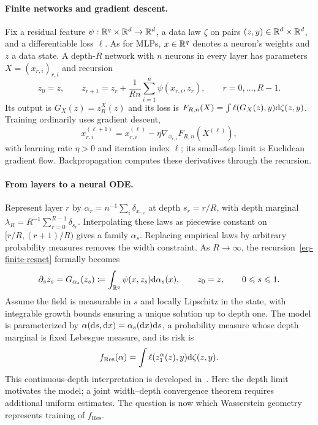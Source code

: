 \paragraph{Finite networks and gradient descent.}
Fix a residual feature $\psi:\mathbb{R}^q\times\mathbb{R}^d\to\mathbb{R}^d$, a data law $\zeta$ on pairs $(z,y)\in\mathbb{R}^d\times\mathbb{R}^d$, and a differentiable loss $\ell$. As for MLPs, $x\in\mathbb{R}^q$ denotes a neuron's weights and $z$ a data state. A depth-$R$ network with $n$ neurons in every layer has parameters $X=(x_{r,i})_{r,i}$ and recursion
\begin{equation}\label{eq-finite-resnet}
  z_0=z,\qquad
  z_{r+1}=z_r+\frac1{Rn}\sum_{i=1}^n\psi(x_{r,i},z_r),
  \qquad r=0,\ldots,R-1.
\end{equation}
Its output is $G_X(z)=z_R^X(z)$ and its loss is $F_{R,n}(X)=\int\ell(G_X(z),y)\mathrm{d}\zeta(z,y)$. Training ordinarily uses gradient descent,
\[
  x_{r,i}^{(\ell+1)}=x_{r,i}^{(\ell)}
  -\eta\nabla_{x_{r,i}}F_{R,n}(X^{(\ell)}),
\]
with learning rate $\eta>0$ and iteration index $\ell$; its small-step limit is Euclidean gradient flow. Backpropagation computes these derivatives through the recursion.

\paragraph{From layers to a neural ODE.}
Represent layer $r$ by $\alpha_r=n^{-1}\sum_i\delta_{x_{r,i}}$ at depth $s_r=r/R$, with depth marginal $\lambda_R=R^{-1}\sum_{r=0}^{R-1}\delta_{s_r}$. Interpolating these laws as piecewise constant on $[r/R,(r+1)/R)$ gives a family $\alpha_s$. Replacing empirical laws by arbitrary probability measures removes the width constraint. As $R\to\infty$, the recursion~\eqref{eq-finite-resnet} formally becomes
\begin{equation}\label{eq-mean-field-resnet-forward}
  \partial_s z_s=G_{\alpha_s}(z_s)
  \coloneqq\int_{\mathbb{R}^q}\psi(x,z_s)\mathrm{d}\alpha_s(x),
  \qquad z_0=z,\qquad 0\leqslant s\leqslant1.
\end{equation}
Assume the field is measurable in $s$ and locally Lipschitz in the state, with integrable growth bounds ensuring a unique solution up to depth one. The model is parameterized by $\alpha(\mathrm{d} s,\mathrm{d} x)=\alpha_s(\mathrm{d} x)\mathrm{d} s$, a probability measure whose depth marginal is fixed Lebesgue measure, and its risk is
\begin{equation}\label{eq-resnet-risk}
  f_{\mathrm{Res}}(\alpha)=\int\ell(z_1^\alpha(z),y)\mathrm{d}\zeta(z,y).
\end{equation}
This continuous-depth interpretation is developed in~\cite{HaberRuthotto2017StableArchitectures,LuZhongLiDong2018BeyondFiniteLayers,Chen2018NeuralODE,EHanLi2019MeanFieldDeepLearning}. Here the depth limit motivates the model; a joint width--depth convergence theorem requires additional uniform estimates. The question is now which Wasserstein geometry represents training of $f_{\mathrm{Res}}$.

